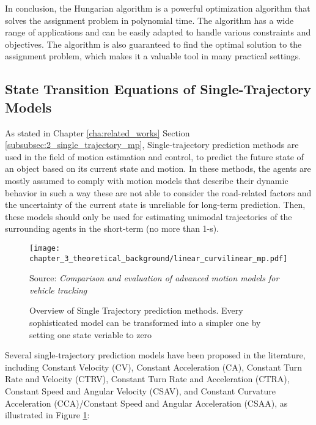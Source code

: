 In conclusion, the Hungarian algorithm is a powerful optimization algorithm that solves the assignment problem in polynomial time. The algorithm has a wide range of applications and can be easily adapted to handle various constraints and objectives. The algorithm is also guaranteed to find the optimal solution to the assignment problem, which makes it a valuable tool in many practical settings.
	
\subsection{State Transition Equations of Single-Trajectory Models}
\label{subsec:3_state_transitions_single_traj}

As stated in Chapter \ref{cha:related_works} Section \ref{subsubsec:2_single_trajectory_mp}, Single-trajectory prediction methods are used in the field of motion estimation and control, to predict the future state of an object based on its current state and motion. In these methods, the agents are mostly assumed to comply with motion models that describe their dynamic behavior in such a way these are not able to consider the road-related factors and the uncertainty of the current state is unreliable for long-term prediction. Then, these models should only be used for estimating unimodal trajectories of the surrounding agents in the short-term (no more than 1-s).

\begin{figure}[h]
	\centering
	\texttt{[image: chapter\_3\_theoretical\_background/linear\_curvilinear\_mp.pdf]}
	\caption[Overview of Single Trajectory prediction methods]{Overview of Single Trajectory prediction methods. Every sophisticated model can be transformed into a simpler one by setting one state veriable to zero}
	Source: \textit{Comparison and evaluation of advanced motion models for vehicle tracking} \cite{schubert2008comparison}
	\label{fig:chapter_3_theoretical_background/linear_curvilinear_mp}
\end{figure}

Several single-trajectory prediction models have been proposed in the literature, including Constant Velocity (CV), Constant Acceleration (CA), Constant Turn Rate and Velocity (CTRV), Constant Turn Rate and Acceleration (CTRA), Constant Speed and Angular Velocity (CSAV), and Constant Curvature Acceleration (CCA)/Constant Speed and Angular Acceleration (CSAA), as illustrated in Figure \ref{fig:chapter_3_theoretical_background/linear_curvilinear_mp}:

